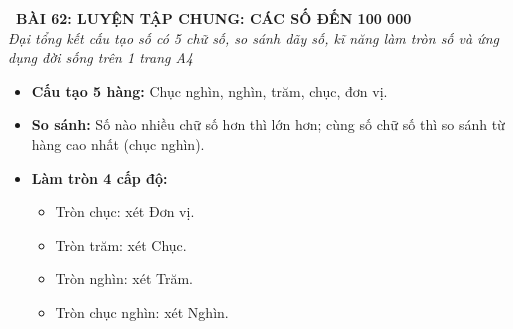 \documentclass[11pt,a4paper]{article}
\begin{document}
\begin{tcolorbox}[
  enhanced,
  colback=white,
  colframe=primary,
  arc=3mm,
  boxrule=1.2pt,
  left=4mm, right=4mm, top=2.5mm, bottom=2.5mm,
  drop shadow=black!10!white
]
  \centering
  {\Large\bfseries\color{primary}\faBookmark\ BÀI 62: LUYỆN TẬP CHUNG: CÁC SỐ ĐẾN 100 000}\\[1.5mm]
  {\small\itshape\color{black!75}Đại tổng kết cấu tạo số có 5 chữ số, so sánh dãy số, kĩ năng làm tròn số và ứng dụng đời sống trên 1 trang A4}
\end{tcolorbox}

\vspace{-2mm}


\noindent
\begin{minipage}[t]{0.49\textwidth}\vspace{0pt}
\begin{tcolorbox}[
  enhanced,
  colback=blue!4!white,
  colframe=blue!75!black,
  arc=2mm, boxrule=0.8pt,
  left=2mm, right=2mm, top=1.8mm, bottom=1.8mm,
  title={\footnotesize\bfseries\color{white}\faKey\ 1. Ma trận kiến thức số đến 100 000}
]
{\footnotesize
\begin{itemize}\setlength{\itemsep}{1.5pt}\setlength{\leftskip}{-2.5mm}
  \item \textbf{Cấu tạo 5 hàng:} Chục nghìn, nghìn, trăm, chục, đơn vị.
  \item \textbf{So sánh:} Số nào nhiều chữ số hơn thì lớn hơn; cùng số chữ số thì so sánh từ hàng cao nhất (chục nghìn).
  \item \textbf{Làm tròn 4 cấp độ:}
  \begin{itemize}\setlength{\itemsep}{0.5pt}\setlength{\leftskip}{-2.5mm}
    \item Tròn chục: xét Đơn vị.
    \item Tròn trăm: xét Chục.
    \item Tròn nghìn: xét Trăm.
    \item Tròn chục nghìn: xét Nghìn.
  \end{itemize}
\end{itemize}
}
\end{tcolorbox}
\end{minipage}
\hfill
\end{document}
